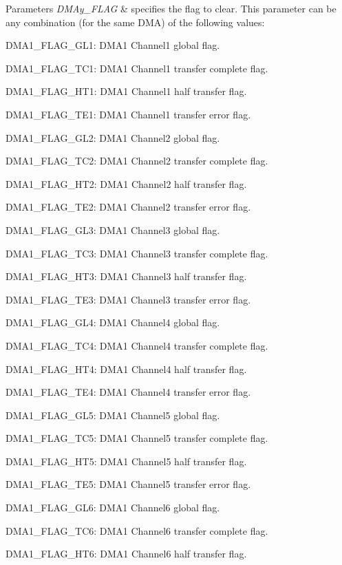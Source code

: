 \begin{DoxyParams}{Parameters}
{\em D\+M\+Ay\+\_\+\+F\+L\+AG} & specifies the flag to clear. This parameter can be any combination (for the same D\+MA) of the following values\+: \begin{DoxyItemize}
\item D\+M\+A1\+\_\+\+F\+L\+A\+G\+\_\+\+G\+L1\+: D\+M\+A1 Channel1 global flag. \item D\+M\+A1\+\_\+\+F\+L\+A\+G\+\_\+\+T\+C1\+: D\+M\+A1 Channel1 transfer complete flag. \item D\+M\+A1\+\_\+\+F\+L\+A\+G\+\_\+\+H\+T1\+: D\+M\+A1 Channel1 half transfer flag. \item D\+M\+A1\+\_\+\+F\+L\+A\+G\+\_\+\+T\+E1\+: D\+M\+A1 Channel1 transfer error flag. \item D\+M\+A1\+\_\+\+F\+L\+A\+G\+\_\+\+G\+L2\+: D\+M\+A1 Channel2 global flag. \item D\+M\+A1\+\_\+\+F\+L\+A\+G\+\_\+\+T\+C2\+: D\+M\+A1 Channel2 transfer complete flag. \item D\+M\+A1\+\_\+\+F\+L\+A\+G\+\_\+\+H\+T2\+: D\+M\+A1 Channel2 half transfer flag. \item D\+M\+A1\+\_\+\+F\+L\+A\+G\+\_\+\+T\+E2\+: D\+M\+A1 Channel2 transfer error flag. \item D\+M\+A1\+\_\+\+F\+L\+A\+G\+\_\+\+G\+L3\+: D\+M\+A1 Channel3 global flag. \item D\+M\+A1\+\_\+\+F\+L\+A\+G\+\_\+\+T\+C3\+: D\+M\+A1 Channel3 transfer complete flag. \item D\+M\+A1\+\_\+\+F\+L\+A\+G\+\_\+\+H\+T3\+: D\+M\+A1 Channel3 half transfer flag. \item D\+M\+A1\+\_\+\+F\+L\+A\+G\+\_\+\+T\+E3\+: D\+M\+A1 Channel3 transfer error flag. \item D\+M\+A1\+\_\+\+F\+L\+A\+G\+\_\+\+G\+L4\+: D\+M\+A1 Channel4 global flag. \item D\+M\+A1\+\_\+\+F\+L\+A\+G\+\_\+\+T\+C4\+: D\+M\+A1 Channel4 transfer complete flag. \item D\+M\+A1\+\_\+\+F\+L\+A\+G\+\_\+\+H\+T4\+: D\+M\+A1 Channel4 half transfer flag. \item D\+M\+A1\+\_\+\+F\+L\+A\+G\+\_\+\+T\+E4\+: D\+M\+A1 Channel4 transfer error flag. \item D\+M\+A1\+\_\+\+F\+L\+A\+G\+\_\+\+G\+L5\+: D\+M\+A1 Channel5 global flag. \item D\+M\+A1\+\_\+\+F\+L\+A\+G\+\_\+\+T\+C5\+: D\+M\+A1 Channel5 transfer complete flag. \item D\+M\+A1\+\_\+\+F\+L\+A\+G\+\_\+\+H\+T5\+: D\+M\+A1 Channel5 half transfer flag. \item D\+M\+A1\+\_\+\+F\+L\+A\+G\+\_\+\+T\+E5\+: D\+M\+A1 Channel5 transfer error flag. \item D\+M\+A1\+\_\+\+F\+L\+A\+G\+\_\+\+G\+L6\+: D\+M\+A1 Channel6 global flag. \item D\+M\+A1\+\_\+\+F\+L\+A\+G\+\_\+\+T\+C6\+: D\+M\+A1 Channel6 transfer complete flag. \item D\+M\+A1\+\_\+\+F\+L\+A\+G\+\_\+\+H\+T6\+: D\+M\+A1 Channel6 half transfer flag. \item 
\end{DoxyItemize}
\end{DoxyParams}

